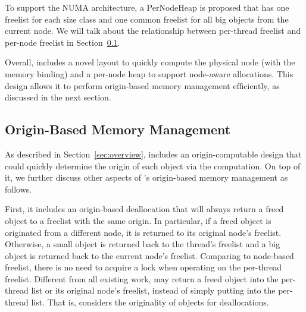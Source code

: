 
To support the NUMA architecture, a PerNodeHeap is proposed that has one freelist for each size class and one common freelist for all big objects  from the current node. We will talk about the relationship between per-thread freelist and per-node freelist in Section~\ref{sec:origin}. 

Overall, \NM{} includes a novel layout to quickly compute the physical node (with the memory binding) and a per-node heap to support node-aware allocations. This design allows it to perform origin-based memory management efficiently, as discussed in the next section. 


\subsection{Origin-Based Memory Management} 
\label{sec:origin}


As described in Section~\ref{sec:overview}, \NM{} includes an origin-computable design that could quickly determine the origin of each object via the computation. On top of it, we further discuss other aspects of \NM{}'s origin-based memory management as follows.  

First, it includes an origin-based deallocation that will always return a freed object to a freelist with the same origin. In particular, if a freed object is originated from a different node, it is returned to its original node's  freelist. Otherwise, a small object is returned back to the thread's freelist and a big object is returned back to the current node's freelist. Comparing to node-based freelist, there is no need to acquire a lock when operating on the per-thread freelist. Different from all existing work, \NM{} may return a freed object into the per-thread list or its original node's freelist, instead of simply putting into the per-thread list. That is, \NM{} considers the originality of objects for deallocations.   

